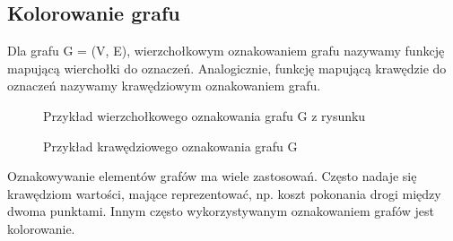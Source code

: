     \subsection{Kolorowanie grafu}
    \begin{definition}
      Dla grafu G = (V, E), wierzchołkowym oznakowaniem grafu nazywamy funkcję
       mapującą wierchołki do oznaczeń. Analogicznie, funkcję mapującą krawędzie do oznaczeń 
       nazywamy krawędziowym oznakowaniem grafu.  
    \end{definition}


    \begin{figure}[H]
      \centering
        \caption{ Przykład wierzchołkowego oznakowania grafu G z rysunku }
     \end{figure}

     \begin{figure}[H]
      \centering
        \caption{ Przykład krawędziowego oznakowania grafu G }
     \end{figure}

     Oznakowywanie elementów grafów ma wiele zastosowań. Często nadaje się krawędziom wartości, mające reprezentować, np.
     koszt pokonania drogi między dwoma punktami. Innym często wykorzystywanym oznakowaniem grafów jest kolorowanie.   
   
